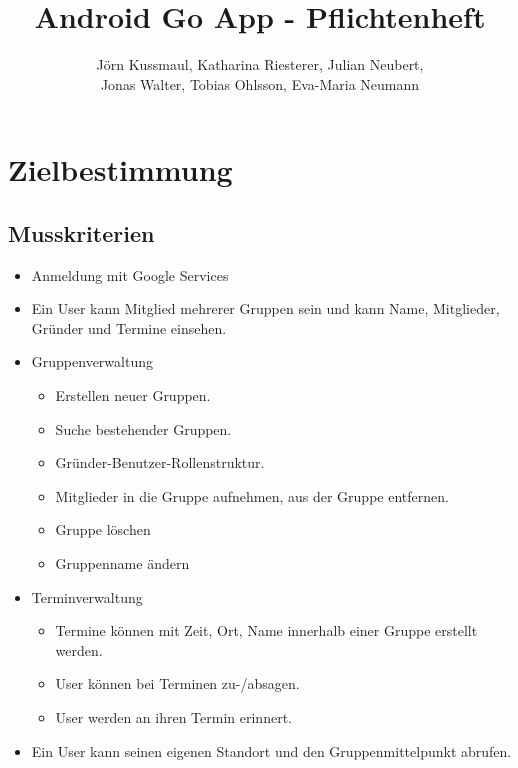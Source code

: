 \documentclass{scrartcl}
\title{Android Go App - Pflichtenheft}
\author{Jörn Kussmaul, Katharina Riesterer, Julian Neubert,\\ Jonas Walter, Tobias Ohlsson, Eva-Maria Neumann}
\begin{document}
	\maketitle
	\newpage
	
	\tableofcontents
	\newpage
	\section{Zielbestimmung}
	\subsection{Musskriterien}
	\begin{itemize}
		\item Anmeldung mit Google Services
		\item Ein User kann Mitglied mehrerer Gruppen sein und kann Name, Mitglieder, Gründer und Termine einsehen.
		\item Gruppenverwaltung
		\begin{itemize}
			\item Erstellen neuer Gruppen.
			\item Suche bestehender Gruppen.
			\item Gründer-Benutzer-Rollenstruktur.
			\item Mitglieder in die Gruppe aufnehmen, aus der Gruppe entfernen.
			\item Gruppe löschen
			\item Gruppenname ändern
		\end{itemize}
		\item Terminverwaltung
		\begin{itemize}
			\item Termine können mit Zeit, Ort, Name innerhalb einer Gruppe erstellt werden.
			\item User können bei Terminen zu-/absagen.
			\item User werden an ihren Termin erinnert.
		\end{itemize}
		\item Ein User kann seinen eigenen Standort und den Gruppenmittelpunkt abrufen.	
	\end{itemize}
\end{document}

